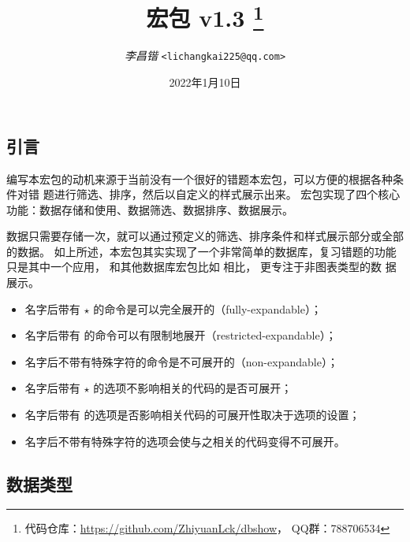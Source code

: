 \documentclass[full]{l3doc}
\def\zhdate{2022年1月10日}
\def\version{v1.3}
\begin{document}
\title{
   宏包 \version%
  \protect\footnote{%
    代码仓库：\url{https://github.com/ZhiyuanLck/dbshow}，
    QQ群：788706534}
}
\author{\textit{李昌锴} \texttt{<lichangkai225@qq.com>}}
\date{\zhdate}
\maketitle

\tableofcontents

\begin{documentation}

\section{引言}
编写本宏包的动机来源于当前没有一个很好的错题本宏包，可以方便的根据各种条件对错
题进行筛选、排序，然后以自定义的样式展示出来。 宏包实现了四个核心
功能：数据存储和使用、数据筛选、数据排序、数据展示。

数据只需要存储一次，就可以通过预定义的筛选、排序条件和样式展示部分或全部的数据。
如上所述，本宏包其实实现了一个非常简单的数据库，复习错题的功能只是其中一个应用，
和其他数据库宏包比如  相比， 更专注于非图表类型的数
据展示。

\begin{itemize}
  \item 名字后带有 $\star$ 的命令是可以完全展开的（fully-expandable）；
  \item 名字后带有  的命令可以有限制地展开（restricted-expandable）；
  \item 名字后不带有特殊字符的命令是不可展开的（non-expandable）；
  \item 名字后带有 $\star$ 的选项不影响相关的代码的是否可展开；
  \item 名字后带有  的选项是否影响相关代码的可展开性取决于选项的设置；
  \item 名字后不带有特殊字符的选项会使与之相关的代码变得不可展开。
\end{itemize}

\subsection{数据类型}


\end{documentation}
\end{document}
